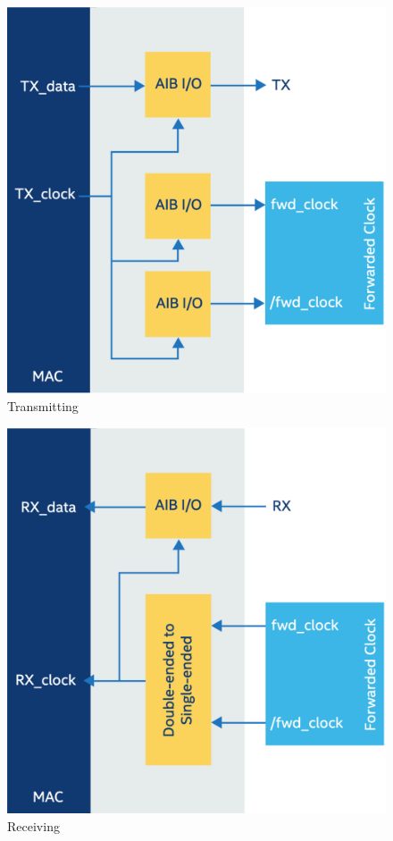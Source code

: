 \documentclass[../main.tex]{subfiles}
\begin{document}
\begin{figure}
    \centering
    \includegraphics[scale=.2]{pngs/AIB-Tx.png}
    \caption{Transmitting\cite{AIBWhitePaper}}
    \label{fig:AIB-Tx}
\end{figure}

\begin{figure}
    \centering
    \includegraphics[scale=.2]{pngs/AIB-Rx.png}
    \caption{Receiving\cite{AIBWhitePaper}}
    \label{fig:AIB-Rx}
\end{figure}
\end{document}
